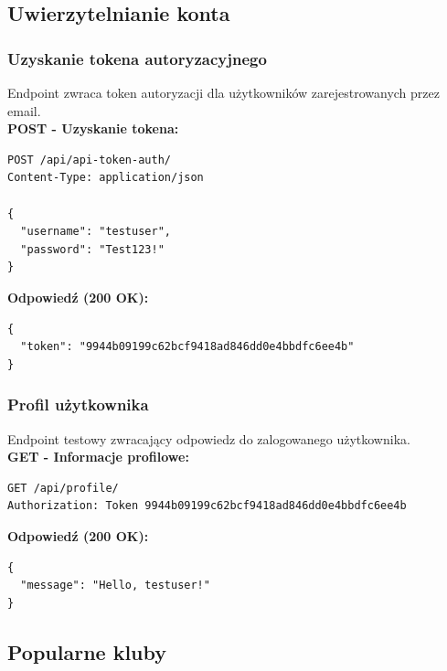 \documentclass[a4paper,12pt]{article}
\begin{document}
\newpage

\subsection{Uwierzytelnianie konta}

\subsubsection{Uzyskanie tokena autoryzacyjnego}

Endpoint zwraca token autoryzacji dla użytkowników zarejestrowanych przez email. \\

\textbf{POST - Uzyskanie tokena:}
\begin{lstlisting}
POST /api/api-token-auth/
Content-Type: application/json

{
  "username": "testuser",
  "password": "Test123!"
}
\end{lstlisting}

\vspace{0.5cm}

\textbf{Odpowiedź (200 OK):}
\begin{lstlisting}
{
  "token": "9944b09199c62bcf9418ad846dd0e4bbdfc6ee4b"
}
\end{lstlisting}

\newpage

\subsubsection{Profil użytkownika}

Endpoint testowy zwracający odpowiedz do zalogowanego użytkownika. \\

\textbf{GET - Informacje profilowe:}
\begin{lstlisting}
GET /api/profile/
Authorization: Token 9944b09199c62bcf9418ad846dd0e4bbdfc6ee4b
\end{lstlisting}

\vspace{0.5cm}

\textbf{Odpowiedź (200 OK):}
\begin{lstlisting}
{
  "message": "Hello, testuser!"
}
\end{lstlisting}

\newpage

\subsection{Popularne kluby}
\end{document}
